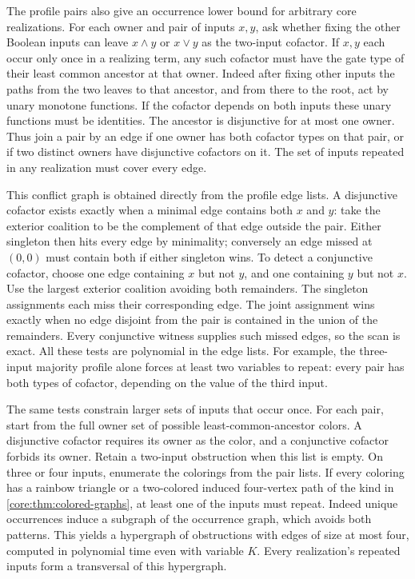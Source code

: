 The profile pairs also give an occurrence lower bound for
arbitrary core realizations. For each owner and pair of inputs
$x,y$, ask whether fixing the other Boolean inputs can leave
$x\land y$ or $x\lor y$ as the two-input cofactor. If $x,y$
each occur only once in a realizing term, any such cofactor
must have the gate type of their least common ancestor at that
owner. Indeed after fixing other inputs the paths from the
two leaves to that ancestor, and from there to the root, act
by unary monotone functions. If the cofactor depends on both
inputs these unary functions must be identities. The ancestor
is disjunctive for at most one owner. Thus join a pair by an
edge if one owner has both cofactor types on that pair, or if
two distinct owners have disjunctive cofactors on it. The set
of inputs repeated in any realization must cover every edge.

This conflict graph is obtained directly from the profile
edge lists. A disjunctive cofactor exists exactly when a
minimal edge contains both $x$ and $y$: take the exterior
coalition to be the complement of that edge outside the pair.
Either singleton then hits every edge by minimality; conversely
an edge missed at $(0,0)$ must contain both if either singleton
wins. To detect a conjunctive cofactor, choose one edge
containing $x$ but not $y$, and one containing $y$ but not $x$.
Use the largest exterior coalition avoiding both remainders.
The singleton assignments each miss their corresponding edge.
The joint assignment wins exactly when no edge disjoint from
the pair is contained in the union of the remainders. Every
conjunctive witness supplies such missed edges, so the scan is
exact. All these tests are polynomial in the edge lists.
For example, the three-input majority profile alone forces
at least two variables to repeat: every pair has both types
of cofactor, depending on the value of the third input.

The same tests constrain larger sets of inputs that occur once.
For each pair, start from the full owner set of possible
least-common-ancestor colors. A disjunctive cofactor requires
its owner as the color, and a conjunctive cofactor forbids its
owner. Retain a two-input obstruction when this list is empty.
On three or four inputs, enumerate the colorings from the pair
lists. If every coloring has a rainbow triangle or a two-colored
induced four-vertex path of the kind in
\cref{core:thm:colored-graphs}, at least one of the inputs must
repeat. Indeed unique occurrences induce a subgraph of the
occurrence graph, which avoids both patterns. This yields a
hypergraph of obstructions with edges of size at most four,
computed in polynomial time even with variable $K$. Every
realization's repeated inputs form a transversal of this
hypergraph.


